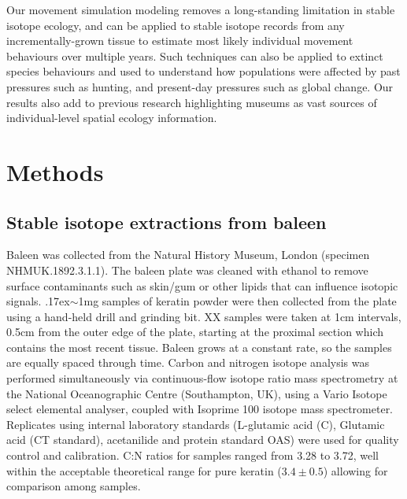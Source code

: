 \documentclass[a4paper,12pt]{article}
\begin{document}
Our movement simulation modeling removes a long-standing limitation in stable isotope ecology, and can be applied to stable isotope records from any incrementally-grown tissue to estimate most likely individual movement behaviours over multiple years. 
Such techniques can also be applied to extinct species behaviours and used to understand how populations were affected by past pressures such as hunting, and present-day pressures such as global change. 
Our results also add to previous research\cite{lister2011natural,ryan2013stable} highlighting museums as vast sources of individual-level spatial ecology information.

\section{Methods}

\subsection{Stable isotope extractions from baleen}
Baleen was collected from the Natural History Museum, London (specimen NHMUK.1892.3.1.1). 
The baleen plate was cleaned with ethanol to remove surface contaminants such as skin/gum or other lipids that can influence isotopic signals. 
{\raise.17ex\hbox{$\scriptstyle\sim$}}1mg samples of keratin powder were then collected from the plate using a hand-held drill and grinding bit. 
XX samples were taken at 1cm intervals, 0.5cm from the outer edge of the plate, starting at the proximal section which contains the most recent tissue. 
Baleen grows at a constant rate, so the samples are equally spaced through time\cite{best1996stable}. 
Carbon and nitrogen isotope analysis was performed simultaneously via continuous-flow isotope ratio mass spectrometry at the National Oceanographic Centre (Southampton, UK), using a Vario Isotope select elemental analyser, coupled with Isoprime 100 isotope mass spectrometer. 
Replicates using internal laboratory standards (L-glutamic acid (C), Glutamic acid (CT standard), acetanilide and protein standard OAS) were used for quality control and calibration. 
C:N ratios for samples ranged from 3.28\text{\textperthousand} to 3.72\text{\textperthousand}, well within the acceptable theoretical range for pure keratin ($3.4\pm0.5$) allowing for comparison among samples\cite{hobson1998stable}. 
 
\end{document}
